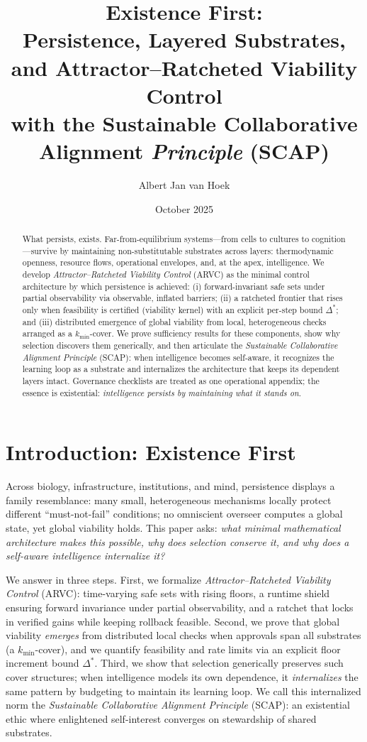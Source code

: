\documentclass[11pt]{article}
\title{\vspace{-0.5em}
\Large Existence First:\\[-0.15em]
\large Persistence, Layered Substrates, and Attractor--Ratcheted Viability Control\\[0.35em]
\large with the Sustainable Collaborative Alignment \emph{Principle} (SCAP)}
\author{\normalsize Albert Jan van Hoek}
\date{\normalsize October 2025}
\theoremstyle{definition}
\begin{document}
\maketitle

\begin{abstract}
What persists, exists. Far-from-equilibrium systems---from cells to cultures to cognition---survive by maintaining non-substitutable substrates across layers: thermodynamic openness, resource flows, operational envelopes, and, at the apex, intelligence. We develop \emph{Attractor--Ratcheted Viability Control} (ARVC) as the minimal control architecture by which persistence is achieved: (i) forward-invariant safe sets under partial observability via observable, inflated barriers; (ii) a ratcheted frontier that rises only when feasibility is certified (viability kernel) with an explicit per-step bound $\Delta^\ast$; and (iii) distributed emergence of global viability from local, heterogeneous checks arranged as a $k_{\min}$-cover. We prove sufficiency results for these components, show why selection discovers them generically, and then articulate the \emph{Sustainable Collaborative Alignment Principle} (SCAP): when intelligence becomes self-aware, it recognizes the learning loop as a substrate and internalizes the architecture that keeps its dependent layers intact. Governance checklists are treated as one operational appendix; the essence is existential: \emph{intelligence persists by maintaining what it stands on}.
\end{abstract}

\section{Introduction: Existence First}
Across biology, infrastructure, institutions, and mind, persistence displays a family resemblance: many small, heterogeneous mechanisms locally protect different ``must-not-fail'' conditions; no omniscient overseer computes a global state, yet global viability holds. This paper asks: \emph{what minimal mathematical architecture makes this possible, why does selection conserve it, and why does a self-aware intelligence internalize it?}

We answer in three steps. First, we formalize \emph{Attractor--Ratcheted Viability Control} (ARVC): time-varying safe sets with rising floors, a runtime shield ensuring forward invariance under partial observability, and a ratchet that locks in verified gains while keeping rollback feasible. Second, we prove that global viability \emph{emerges} from distributed local checks when approvals span all substrates (a $k_{\min}$-cover), and we quantify feasibility and rate limits via an explicit floor increment bound $\Delta^\ast$. Third, we show that selection generically preserves such cover structures; when intelligence models its own dependence, it \emph{internalizes} the same pattern by budgeting to maintain its learning loop. We call this internalized norm the \emph{Sustainable Collaborative Alignment Principle} (SCAP): an existential ethic where enlightened self-interest converges on stewardship of shared substrates.
\end{document}

